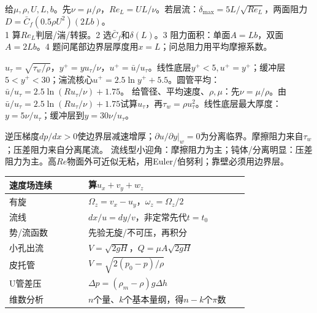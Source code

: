 给$\mu,\rho,U,L,b$。先$\nu=\mu/\rho$，$Re_L=UL/\nu$。若层流：$\delta_{\max}=5L/\sqrt{Re_L}$，两面阻力$D=\bar C_f(0.5\rho U^2)(2Lb)$。\\
1 算$Re_L$判层/湍/转捩。2 选$\bar C_f$和$\delta(L)$。3 阻力面积：单面$A=Lb$，双面$A=2Lb$。4 题问尾部边界层厚度用$x=L$；问总阻力用平均摩擦系数。

$u_\tau=\sqrt{\tau_w/\rho}$，$y^+=yu_\tau/\nu$，$u^+=\bar u/u_\tau$。线性底层$y^+<5,u^+=y^+$；缓冲层$5<y^+<30$；湍流核心$u^+=2.5\ln y^+ +5.5$。圆管平均：$\bar u/u_\tau=2.5\ln(Ru_\tau/\nu)+1.75$。
给管径、平均速度、$\rho,\mu$：先$\nu=\mu/\rho$。由$\bar u/u_\tau=2.5\ln(Ru_\tau/\nu)+1.75$试算$u_\tau$，再$\tau_w=\rho u_\tau^2$。线性底层最大厚度：$y=5\nu/u_\tau$；缓冲层到$y=30\nu/u_\tau$。

逆压梯度$dp/dx>0$使边界层减速增厚；$\partial u/\partial y|_w=0$为分离临界。摩擦阻力来自$\tau_w$；压差阻力来自分离尾流。
流线型小迎角：摩擦阻力为主；钝体/分离明显：压差阻力为主。高$Re$物面外可近似无粘，用Euler/伯努利；靠壁必须用边界层。

\renewcommand{\arraystretch}{0.76}\begin{tabular}{|p{0.30\linewidth}|p{0.61\linewidth}|}
\hline 速度场连续 & 算$u_x+v_y+w_z$\\ \hline
有旋 & $\Omega_z=v_x-u_y$，$\omega_z=\Omega_z/2$\\ \hline
流线 & $dx/u=dy/v$，非定常先代$t=t_0$\\ \hline
势/流函数 & 先验无旋/不可压，再积分\\ \hline
小孔出流 & $V=\sqrt{2gH}$，$Q=\mu A\sqrt{2gH}$\\ \hline
皮托管 & $V=\sqrt{2(p_0-p)/\rho}$\\ \hline
U管差压 & $\Delta p=(\rho_m-\rho)g\Delta h$\\ \hline
维数分析 & $n$个量、$k$个基本量纲，得$n-k$个$\pi$数\\ \hline
\end{tabular}\renewcommand{\arraystretch}{1}

